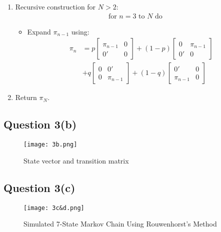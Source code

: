 \documentclass{article}
\begin{document}
\begin{enumerate}
    \item Recursive construction for $N > 2$:
    \begin{align*}
        \text{for } n = 3 \text{ to } N \text{ do}
    \end{align*}
    \begin{itemize}
        \item Expand $\pi_{n-1}$ using:
        \begin{align*}
            \pi_n &= p
            \begin{bmatrix}
                \pi_{n-1} & 0 \\
                0' & 0
            \end{bmatrix}
            + (1 - p)
            \begin{bmatrix}
                0 & \pi_{n-1} \\
                0' & 0
            \end{bmatrix} \\
            &+ q
            \begin{bmatrix}
                0 & 0' \\
                0 & \pi_{n-1}
            \end{bmatrix}
            + (1 - q)
            \begin{bmatrix}
                0' & 0 \\
                \pi_{n-1} & 0
            \end{bmatrix}
        \end{align*}
    \end{itemize}
    
    \item Return $\pi_N$.
\end{enumerate}

\subsection*{Question 3(b)}
\begin{figure}[H]
    \centering
    \texttt{[image: 3b.png]}
    \caption{State vector and transition matrix}
    \label{fig:3b}
\end{figure}

\subsection*{Question 3(c)}
\begin{figure}[H]
    \centering
    \texttt{[image: 3c\&d.png]}
    \caption{Simulated 7-State Markov Chain Using Rouwenhorst's Method}
    \label{fig:3c&d}
\end{figure}
\end{document}
